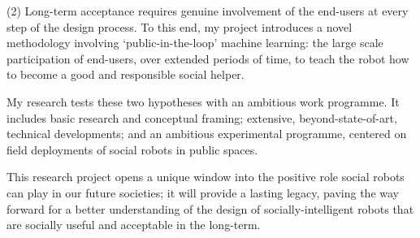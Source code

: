 \documentclass[12pt,a4paper]{article}
\begin{document}
(2) Long-term acceptance requires genuine involvement of the end-users at every
step of the design process. To this end, my project introduces a novel methodology
involving `public-in-the-loop' machine learning: the large scale participation
of end-users, over extended periods of time, to teach the robot how to become a
good and responsible social helper.

My research tests these two hypotheses with an ambitious work programme. It
includes basic research and conceptual framing; extensive, beyond-state-of-art,
technical developments; and an ambitious experimental programme, centered on
field deployments of social robots in public spaces.

This research project opens a unique window into the positive role social robots
can play in our future societies; it will provide a lasting legacy, paving the
way forward for a better understanding of the design of socially-intelligent
robots that are socially useful and acceptable in the long-term.


\newpage

\tableofcontents

\pagebreak




\pagebreak

%


\pagebreak





%

\pagebreak
\printbibliography
\end{document}
